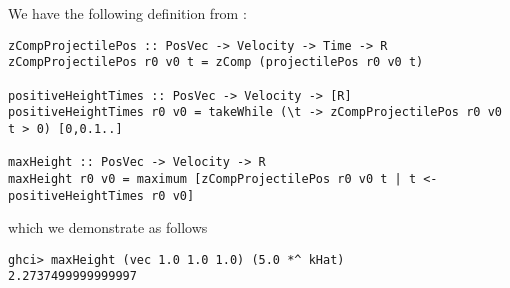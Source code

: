 
We have the following definition from :
\scriptsize\begin{verbatim}
zCompProjectilePos :: PosVec -> Velocity -> Time -> R
zCompProjectilePos r0 v0 t = zComp (projectilePos r0 v0 t)

positiveHeightTimes :: PosVec -> Velocity -> [R]
positiveHeightTimes r0 v0 = takeWhile (\t -> zCompProjectilePos r0 v0 t > 0) [0,0.1..]

maxHeight :: PosVec -> Velocity -> R
maxHeight r0 v0 = maximum [zCompProjectilePos r0 v0 t | t <- positiveHeightTimes r0 v0]
\end{verbatim}\normalsize
which we demonstrate as follows
\scriptsize\begin{verbatim}
ghci> maxHeight (vec 1.0 1.0 1.0) (5.0 *^ kHat)
2.2737499999999997
\end{verbatim}\normalsize
